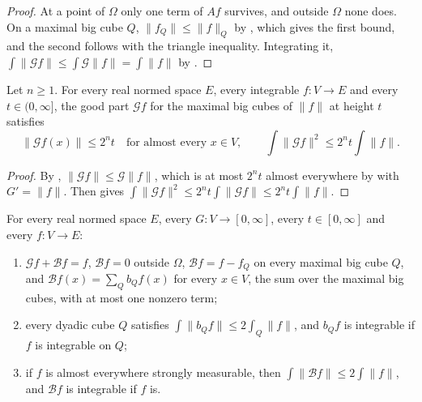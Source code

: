 \begin{proof}
\leanok
At a point of $\Omega$ only one term of $A f$ survives, and outside $\Omega$ none does. On a
maximal big cube $Q$, $\|f_Q\| \leq \|f\|_Q$ by , which gives
the first bound, and the second follows with the triangle inequality. Integrating it,
$\int \|\mathcal G f\| \leq \int \mathcal G \|f\| = \int \|f\|$ by
.
\end{proof}

\begin{theorem}
\label{thm:calderon-zygmund-signed-good-bounds}
\leanok
{}
Let $n \geq 1$. For every real normed space $E$, every integrable $f : V \to E$ and every
$t \in (0, \infty]$, the good part $\mathcal G f$ for the maximal big cubes of $\|f\|$ at
height $t$ satisfies
\[
  \|\mathcal G f(x)\| \leq 2^n t \quad \text{for almost every } x \in V, \qquad
  \int \|\mathcal G f\|^2 \leq 2^n t \int \|f\| .
\]
\end{theorem}

\begin{proof}
\leanok
By , $\|\mathcal G f\| \leq \mathcal G \|f\|$, which is
at most $2^n t$ almost everywhere by  with
$G' = \|f\|$. Then  gives
$\int \|\mathcal G f\|^2 \leq 2^n t \int \|\mathcal G f\| \leq 2^n t \int \|f\|$.
\end{proof}

\begin{lemma}
\label{lem:calderon-zygmund-bad-pieces}
\leanok
{}
For every real normed space $E$, every $G : V \to [0, \infty]$, every $t \in [0, \infty]$ and
every $f : V \to E$:
\begin{enumerate}
  \item $\mathcal G f + \mathcal B f = f$, $\mathcal B f = 0$ outside $\Omega$,
    $\mathcal B f = f - f_Q$ on every maximal big cube $Q$, and
    $\mathcal B f(x) = \sum_Q b_Q f(x)$ for every $x \in V$, the sum over the maximal big cubes,
    with at most one nonzero term;
  \item every dyadic cube $Q$ satisfies $\int \|b_Q f\| \leq 2 \int_Q \|f\|$, and $b_Q f$ is
    integrable if $f$ is integrable on $Q$;
  \item if $f$ is almost everywhere strongly measurable, then
    $\int \|\mathcal B f\| \leq 2 \int \|f\|$, and $\mathcal B f$ is integrable if $f$ is.
\end{enumerate}
\end{lemma}

